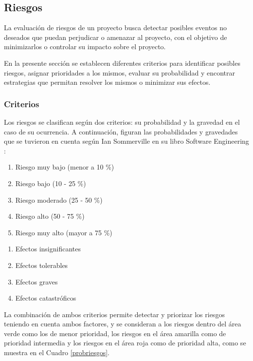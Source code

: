 \subsection{Riesgos}

La evaluación de riesgos de un proyecto busca detectar posibles eventos no deseados que puedan perjudicar o amenazar al proyecto, con el objetivo de minimizarlos o controlar su impacto sobre el proyecto.

En la presente sección se establecen diferentes criterios para identificar posibles riesgos, asignar prioridades a los mismos, evaluar su probabilidad y encontrar estrategias que permitan resolver los mismos o minimizar sus efectos.


\subsubsection{Criterios}

Los riesgos se clasifican según dos criterios: su probabilidad y la gravedad en el caso de su ocurrencia. A continuación, figuran las probabilidades y gravedades que se tuvieron en cuenta según Ian Sommerville en su libro Software Engineering \cite{sommerville}:

\begin{enumerate}
    \item Riesgo muy bajo (menor a 10 \%)
    \item Riesgo bajo (10 - 25 \%)
    \item Riesgo moderado (25 - 50 \%)
    \item Riesgo alto (50 - 75 \%)
    \item Riesgo muy alto (mayor a 75 \%)
\end{enumerate}

\begin{enumerate}
    \item Efectos insignificantes
    \item Efectos tolerables
    \item Efectos graves
    \item Efectos catastróficos
\end{enumerate}

La combinación de ambos criterios permite detectar y priorizar los riesgos teniendo en cuenta ambos factores, y se consideran a los riesgos dentro del área verde como los de menor prioridad, los riesgos en el área amarilla como de prioridad intermedia y los riesgos en el área roja como de prioridad alta, como se muestra en el Cuadro \ref{probriesgos}.

